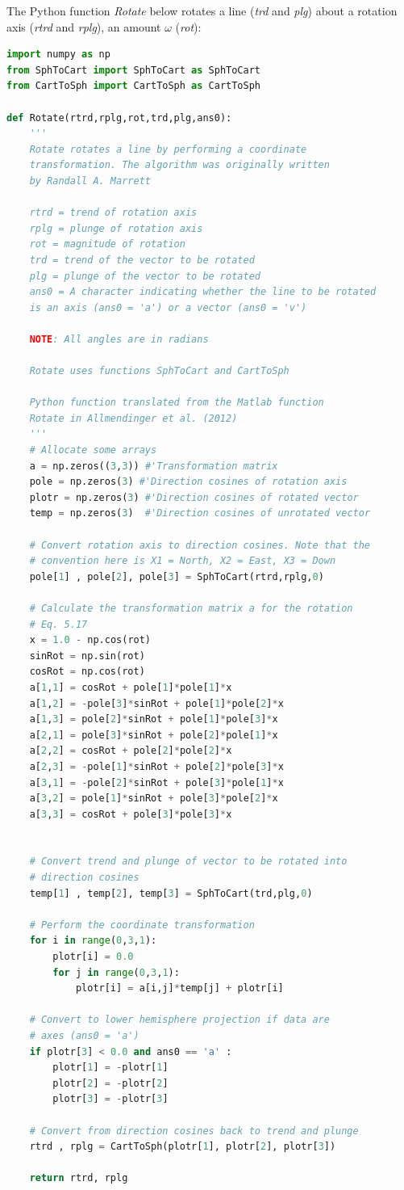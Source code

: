 \documentclass[a4paper , 12pt]{book}
\begin{document}
The Python function \textit{Rotate} below rotates a line (\textit{trd} and \textit{plg}) about a rotation axis (\textit{rtrd} and \textit{rplg}), an amount $\omega$ (\textit{rot}):

\begin{lstlisting}[language=Python, frame=single]
import numpy as np
from SphToCart import SphToCart as SphToCart
from CartToSph import CartToSph as CartToSph

def Rotate(rtrd,rplg,rot,trd,plg,ans0):
    '''
	Rotate rotates a line by performing a coordinate 
	transformation. The algorithm was originally written 
	by Randall A. Marrett

	rtrd = trend of rotation axis
	rplg = plunge of rotation axis
	rot = magnitude of rotation
	trd = trend of the vector to be rotated
	plg = plunge of the vector to be rotated
	ans0 = A character indicating whether the line to be rotated 
	is an axis (ans0 = 'a') or a vector (ans0 = 'v')

	NOTE: All angles are in radians
	
	Rotate uses functions SphToCart and CartToSph
	
	Python function translated from the Matlab function 
	Rotate in Allmendinger et al. (2012)
	'''
    # Allocate some arrays
    a = np.zeros((3,3)) #'Transformation matrix
    pole = np.zeros(3) #'Direction cosines of rotation axis
    plotr = np.zeros(3) #'Direction cosines of rotated vector
    temp = np.zeros(3)  #'Direction cosines of unrotated vector
    
    # Convert rotation axis to direction cosines. Note that the 
    # convention here is X1 = North, X2 = East, X3 = Down
    pole[1] , pole[2], pole[3] = SphToCart(rtrd,rplg,0)
    
    # Calculate the transformation matrix a for the rotation
    # Eq. 5.17
    x = 1.0 - np.cos(rot)
    sinRot = np.sin(rot)
    cosRot = np.cos(rot)
    a[1,1] = cosRot + pole[1]*pole[1]*x
    a[1,2] = -pole[3]*sinRot + pole[1]*pole[2]*x
    a[1,3] = pole[2]*sinRot + pole[1]*pole[3]*x
    a[2,1] = pole[3]*sinRot + pole[2]*pole[1]*x
    a[2,2] = cosRot + pole[2]*pole[2]*x
    a[2,3] = -pole[1]*sinRot + pole[2]*pole[3]*x
    a[3,1] = -pole[2]*sinRot + pole[3]*pole[1]*x
    a[3,2] = pole[1]*sinRot + pole[3]*pole[2]*x
    a[3,3] = cosRot + pole[3]*pole[3]*x
    
    
    # Convert trend and plunge of vector to be rotated into 
    # direction cosines
    temp[1] , temp[2], temp[3] = SphToCart(trd,plg,0)
    
    # Perform the coordinate transformation
    for i in range(0,3,1):
        plotr[i] = 0.0
        for j in range(0,3,1):
            plotr[i] = a[i,j]*temp[j] + plotr[i]
            
    # Convert to lower hemisphere projection if data are
    # axes (ans0 = 'a')
    if plotr[3] < 0.0 and ans0 == 'a' :
        plotr[1] = -plotr[1]
        plotr[2] = -plotr[2]
        plotr[3] = -plotr[3]
        
    # Convert from direction cosines back to trend and plunge
    rtrd , rplg = CartToSph(plotr[1], plotr[2], plotr[3])
    
    return rtrd, rplg
\end{lstlisting}
\end{document}

